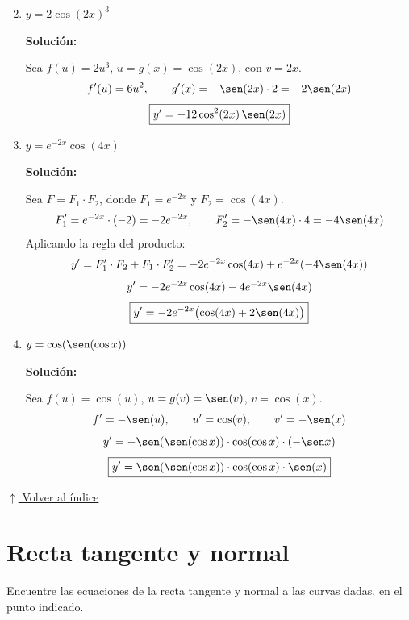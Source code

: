 \documentclass[12pt]{article}
\newcommand{\solucion}{%
    \vspace{0.8em}%
    \textbf{Solución:}%
}
\newcommand{\volverindice}{%
    \vspace{1em}%
    \begin{flushright}%
        \hyperlink{indice}{\small $\uparrow$ Volver al índice}%
    \end{flushright}%
}
\begin{document}
\begin{enumerate}[label=\alph*.-]
    \setcounter{enumi}{1} %
    \item $y = 2\cos(2x)^3$

    \solucion

    Sea $f(u) = 2u^3$, $u = g(x) = \cos(2x)$, con $v = 2x$.
    \[
    f'(u) = 6u^2, \qquad g'(x) = -\sen(2x) \cdot 2 = -2\sen(2x)
    \]
    \[
    \boxed{y' = -12\cos^2(2x)\,\sen(2x)}
    \]

    \setcounter{enumi}{7} %
    \item $y = e^{-2x}\cos(4x)$

    \solucion

    Sea $F = F_1 \cdot F_2$, donde $F_1 = e^{-2x}$ y $F_2 = \cos(4x)$.
    \[
    F_1' = e^{-2x} \cdot (-2) = -2e^{-2x}, \qquad F_2' = -\sen(4x) \cdot 4 = -4\sen(4x)
    \]
    Aplicando la regla del producto:
    \[
    y' = F_1' \cdot F_2 + F_1 \cdot F_2' = -2e^{-2x}\cos(4x) + e^{-2x}(-4\sen(4x))
    \]
    \[
    y' = -2e^{-2x}\cos(4x) - 4e^{-2x}\sen(4x)
    \]
    \[
    \boxed{y' = -2e^{-2x}\bigl(\cos(4x) + 2\sen(4x)\bigr)}
    \]

    \item $y = \cos(\sen(\cos x))$

    \solucion

    Sea $f(u) = \cos(u)$, $u = g(v) = \sen(v)$, $v = \cos(x)$.
    \[
    f' = -\sen(u), \qquad u' = \cos(v), \qquad v' = -\sen(x)
    \]
    \[
    y' = -\sen(\sen(\cos x)) \cdot \cos(\cos x) \cdot (-\sen x)
    \]
    \[
    \boxed{y' = \sen(\sen(\cos x))\cdot\cos(\cos x)\cdot\sen(x)}
    \]
\end{enumerate}

\volverindice
\newpage

\section{Recta tangente y normal}
Encuentre las ecuaciones de la recta tangente y normal a las curvas dadas, en el punto indicado.
\end{document}
